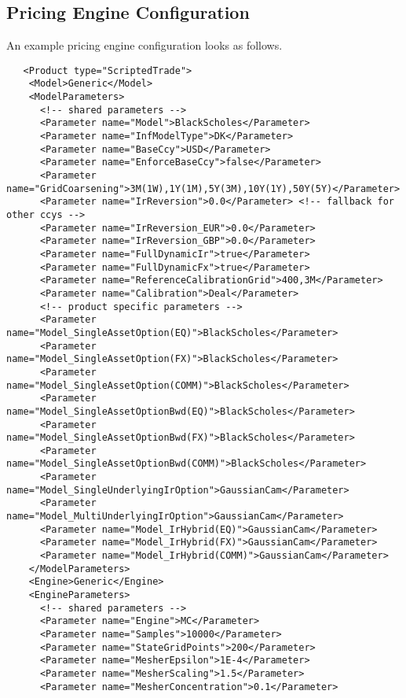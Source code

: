 \subsection{Pricing Engine Configuration}\label{pricingengine_config}

An example pricing engine configuration looks as follows.

\begin{verbatim}
   <Product type="ScriptedTrade">
    <Model>Generic</Model>
    <ModelParameters>
      <!-- shared parameters -->
      <Parameter name="Model">BlackScholes</Parameter>
      <Parameter name="InfModelType">DK</Parameter>
      <Parameter name="BaseCcy">USD</Parameter>
      <Parameter name="EnforceBaseCcy">false</Parameter>
      <Parameter name="GridCoarsening">3M(1W),1Y(1M),5Y(3M),10Y(1Y),50Y(5Y)</Parameter>
      <Parameter name="IrReversion">0.0</Parameter> <!-- fallback for other ccys -->
      <Parameter name="IrReversion_EUR">0.0</Parameter>
      <Parameter name="IrReversion_GBP">0.0</Parameter>
      <Parameter name="FullDynamicIr">true</Parameter>
      <Parameter name="FullDynamicFx">true</Parameter>
      <Parameter name="ReferenceCalibrationGrid">400,3M</Parameter>
      <Parameter name="Calibration">Deal</Parameter>
      <!-- product specific parameters -->
      <Parameter name="Model_SingleAssetOption(EQ)">BlackScholes</Parameter>
      <Parameter name="Model_SingleAssetOption(FX)">BlackScholes</Parameter>
      <Parameter name="Model_SingleAssetOption(COMM)">BlackScholes</Parameter>
      <Parameter name="Model_SingleAssetOptionBwd(EQ)">BlackScholes</Parameter>
      <Parameter name="Model_SingleAssetOptionBwd(FX)">BlackScholes</Parameter>
      <Parameter name="Model_SingleAssetOptionBwd(COMM)">BlackScholes</Parameter>
      <Parameter name="Model_SingleUnderlyingIrOption">GaussianCam</Parameter>
      <Parameter name="Model_MultiUnderlyingIrOption">GaussianCam</Parameter>
      <Parameter name="Model_IrHybrid(EQ)">GaussianCam</Parameter>
      <Parameter name="Model_IrHybrid(FX)">GaussianCam</Parameter>
      <Parameter name="Model_IrHybrid(COMM)">GaussianCam</Parameter>
    </ModelParameters>
    <Engine>Generic</Engine>
    <EngineParameters>
      <!-- shared parameters -->
      <Parameter name="Engine">MC</Parameter>
      <Parameter name="Samples">10000</Parameter>
      <Parameter name="StateGridPoints">200</Parameter>
      <Parameter name="MesherEpsilon">1E-4</Parameter>
      <Parameter name="MesherScaling">1.5</Parameter>
      <Parameter name="MesherConcentration">0.1</Parameter>

\end{verbatim}
